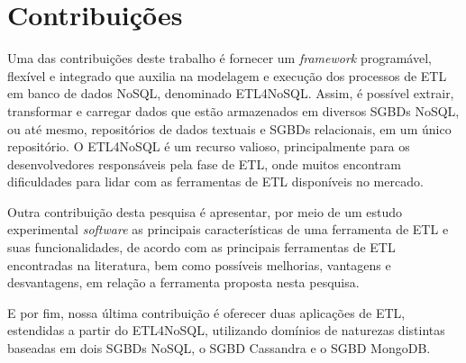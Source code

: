 
\section{Contribuições}

Uma das contribuições deste trabalho é fornecer um \textit{framework} programável, flexível e integrado que auxilia na modelagem e execução dos processos de ETL em banco de dados NoSQL, denominado ETL4NoSQL. Assim, é possível extrair, transformar e carregar dados que estão armazenados em diversos SGBDs NoSQL, ou até mesmo, repositórios de dados textuais e SGBDs relacionais, em um único repositório. O ETL4NoSQL é um recurso valioso, principalmente para os desenvolvedores responsáveis pela fase de ETL, onde muitos encontram dificuldades para lidar com as ferramentas de ETL disponíveis no mercado. 

Outra contribuição desta pesquisa é apresentar, por meio de um estudo experimental \textit{software} as principais características de uma ferramenta de ETL e suas funcionalidades, de acordo com as principais ferramentas de ETL encontradas na literatura, bem como possíveis melhorias, vantagens e desvantagens, em relação a ferramenta proposta nesta pesquisa.

E por fim, nossa última contribuição é oferecer duas aplicações de ETL, estendidas a partir do ETL4NoSQL, utilizando domínios de naturezas distintas baseadas em dois SGBDs NoSQL, o SGBD Cassandra e o SGBD MongoDB. 


